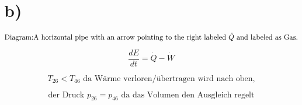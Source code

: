 

\section*{b)}

\begin{equation*}
\text{Diagram:} \\
\text{A horizontal pipe with an arrow pointing to the right labeled } \dot{Q} \text{ and labeled as } \text{Gas}. \\
\end{equation*}

\begin{equation*}
\frac{dE}{dt} = \dot{Q} - \dot{W}
\end{equation*}

\begin{equation*}
T_{26} < T_{46} \text{ da Wärme verloren/übertragen wird nach oben,}
\end{equation*}

\begin{equation*}
\text{der Druck } p_{26} = p_{46} \text{ da das Volumen den Ausgleich regelt}
\end{equation*}